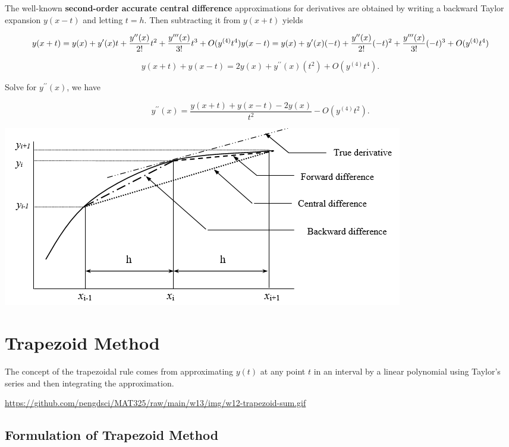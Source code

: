 \documentclass[
]{book}
\begin{document}
The well-known \textbf{second-order accurate central difference} approximations for derivatives are obtained by writing a backward Taylor expansion \(y(x-t)\) and letting \(t = h\). Then subtracting it from \(y(x+t)\) yields

\[
y(x+t)=y(x) + y^\prime(x)t + \frac{y^{\prime\prime} (x)}{2!} t^2  + \frac{y^{\prime\prime\prime} (x)}{3!} t^3 + O(y^{(4)}t^4) \\
y(x-t)=y(x) + y^\prime(x)(-t) + \frac{y^{\prime\prime} (x)}{2!} (-t)^2  + \frac{y^{\prime\prime\prime} (x)}{3!} (-t)^3 + O(y^{(4)}t^4)\\
\]

\[
y(x+t) + y(x-t) = 2y(x) + y^{\prime\prime}(x)(t^2) + O(y^{(4)}t^4).
\]

Solve for \(y^{\prime\prime}(x)\), we have

\[
y^{\prime\prime}(x) = \frac{y(x+t) + y(x-t) - 2y(x)}{t^2} - O(y^{(4)}t^2).
\]

\hfill\break

\begin{center}\includegraphics[width=0.65\linewidth]{img12/w12-ApproximatingDerivatives} \end{center}

\hfill\break

\hypertarget{trapezoid-method}{%
\section{Trapezoid Method}\label{trapezoid-method}}

The concept of the trapezoidal rule comes from approximating \(y(t)\) at any point \(t\) in an interval by a linear polynomial using Taylor's series and then integrating the approximation.

\hfill\break

\url{https://github.com/pengdsci/MAT325/raw/main/w13/img/w12-trapezoid-sum.gif}\\

\hypertarget{formulation-of-trapezoid-method}{%
\subsection{Formulation of Trapezoid Method}\label{formulation-of-trapezoid-method}}
\end{document}
